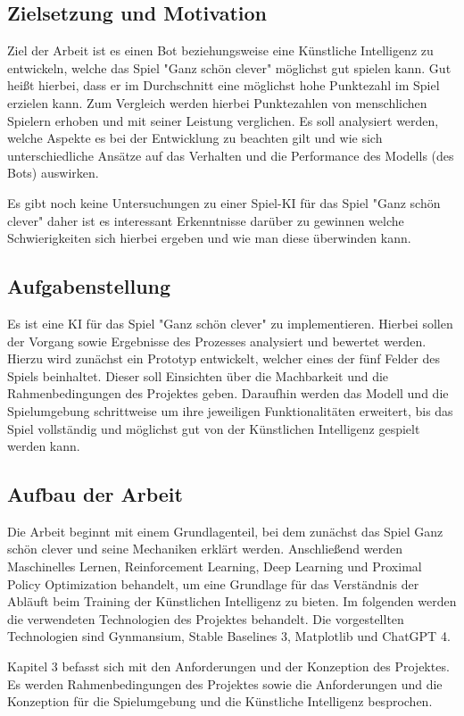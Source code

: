 \subsection{Zielsetzung und Motivation}
Ziel der Arbeit ist es einen Bot beziehungsweise eine Künstliche Intelligenz zu entwickeln, welche das Spiel "Ganz schön clever" möglichst gut spielen kann. Gut heißt hierbei, dass er im Durchschnitt eine möglichst hohe Punktezahl im Spiel erzielen kann. Zum Vergleich werden hierbei Punktezahlen von menschlichen Spielern erhoben und mit seiner Leistung verglichen. Es soll analysiert werden, welche Aspekte es bei der Entwicklung zu beachten gilt und wie sich unterschiedliche Ansätze auf das Verhalten und die Performance des Modells (des Bots) auswirken.

Es gibt noch keine Untersuchungen zu einer Spiel-KI für das Spiel "Ganz schön clever" daher ist es interessant Erkenntnisse darüber zu gewinnen welche Schwierigkeiten sich hierbei ergeben und wie man diese überwinden kann.
\subsection{Aufgabenstellung}
Es ist eine KI für das Spiel "Ganz schön clever" zu implementieren. Hierbei sollen der Vorgang sowie Ergebnisse des Prozesses analysiert und bewertet werden. Hierzu wird zunächst ein Prototyp entwickelt, welcher eines der fünf Felder des Spiels beinhaltet. Dieser soll Einsichten über die Machbarkeit und die Rahmenbedingungen des Projektes geben. Daraufhin werden das Modell und die Spielumgebung schrittweise um ihre jeweiligen Funktionalitäten erweitert, bis das Spiel vollständig und möglichst gut von der Künstlichen Intelligenz gespielt werden kann.
\subsection{Aufbau der Arbeit}
Die Arbeit beginnt mit einem Grundlagenteil, bei dem zunächst das Spiel Ganz schön clever und seine Mechaniken erklärt werden. Anschließend werden Maschinelles Lernen, Reinforcement Learning, Deep Learning und Proximal Policy Optimization behandelt, um eine Grundlage für das Verständnis der Abläuft beim Training der Künstlichen Intelligenz zu bieten. Im folgenden werden die verwendeten Technologien des Projektes behandelt. Die vorgestellten Technologien sind Gynmansium, Stable Baselines 3, Matplotlib und ChatGPT 4.

Kapitel 3 befasst sich mit den Anforderungen und der Konzeption des Projektes. Es werden Rahmenbedingungen des Projektes sowie die Anforderungen und die Konzeption für die Spielumgebung und die Künstliche Intelligenz besprochen.

